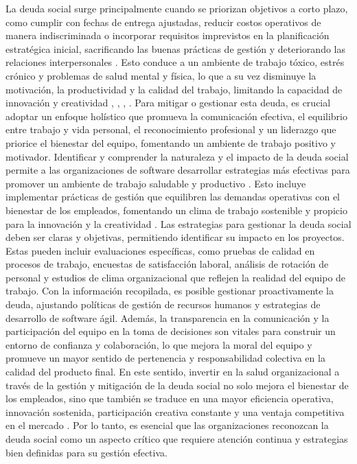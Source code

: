 La deuda social surge principalmente cuando se priorizan objetivos a corto plazo, como cumplir con fechas de entrega ajustadas, reducir costos operativos de manera indiscriminada o incorporar requisitos imprevistos en la planificación estratégica inicial, sacrificando las buenas prácticas de gestión y deteriorando las relaciones interpersonales \cite{caballero2021thesis}. Esto conduce a un ambiente de trabajo tóxico, estrés crónico y problemas de salud mental y física, lo que a su vez disminuye la motivación, la productividad y la calidad del trabajo, limitando la capacidad de innovación y creatividad \cite{caballero2022communitysmells}, \cite{tamburri2013socialdebt}, \cite{caballero2021thesis}, \cite{dreesen2021socialdebt}. Para mitigar o gestionar esta deuda, es crucial adoptar un enfoque holístico que promueva la comunicación efectiva, el equilibrio entre trabajo y vida personal, el reconocimiento profesional y un liderazgo que priorice el bienestar del equipo, fomentando un ambiente de trabajo positivo y motivador.
Identificar y comprender la naturaleza y el impacto de la deuda social permite a las organizaciones de software desarrollar estrategias más efectivas para promover un ambiente de trabajo saludable y productivo \cite{dreesen2021socialdebt}. Esto incluye implementar prácticas de gestión que equilibren las demandas operativas con el bienestar de los empleados, fomentando un clima de trabajo sostenible y propicio para la innovación y la creatividad \cite{caballero2022communitysmells}. Las estrategias para gestionar la deuda social deben ser claras y objetivas, permitiendo identificar su impacto en los proyectos. Estas pueden incluir evaluaciones específicas, como pruebas de calidad en procesos de trabajo, encuestas de satisfacción laboral, análisis de rotación de personal y estudios de clima organizacional que reflejen la realidad del equipo de trabajo. Con la información recopilada, es posible gestionar proactivamente la deuda, ajustando políticas de gestión de recursos humanos y estrategias de desarrollo de software ágil.
Además, la transparencia en la comunicación y la participación del equipo en la toma de decisiones son vitales para construir un entorno de confianza y colaboración, lo que mejora la moral del equipo y promueve un mayor sentido de pertenencia y responsabilidad colectiva en la calidad del producto final. En este sentido, invertir en la salud organizacional a través de la gestión y mitigación de la deuda social no solo mejora el bienestar de los empleados, sino que también se traduce en una mayor eficiencia operativa, innovación sostenida, participación creativa constante y una ventaja competitiva en el mercado \cite{caballero2022communitysmells}. Por lo tanto, es esencial que las organizaciones reconozcan la deuda social como un aspecto crítico que requiere atención continua y estrategias bien definidas para su gestión efectiva.
